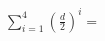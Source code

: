 \documentclass[preview]{standalone}
\begin{document}
\begin{align*}
\sum_{i=1}^4 \left(\frac{d}{2}\right)^i=
\end{align*}
\end{document}

